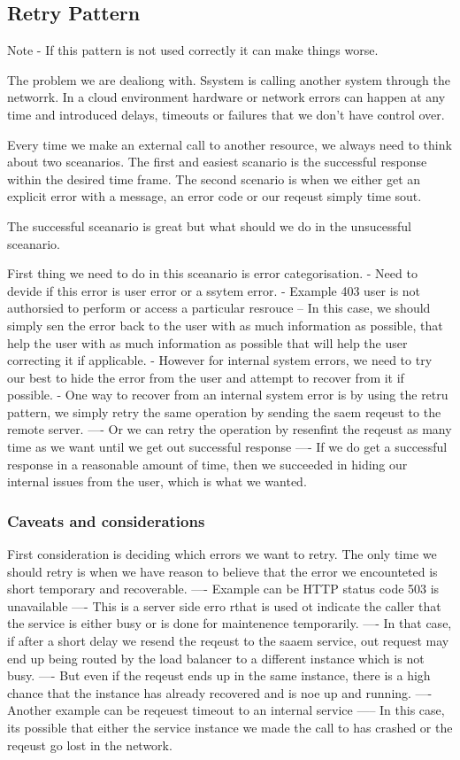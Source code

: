 \documentclass[a4paper, 11pt]{book}
\begin{document}
    \subsection{Retry Pattern}
    Note - If this pattern is not used correctly it can make things worse.

    The problem we are dealiong with.
    Ssystem is calling another system through the networrk.
    In a cloud environment hardware or network errors can happen at any time and introduced delays, timeouts or failures that we don't have control over.

    Every time we make an external call to another resource, we always need to think about two sceanarios.
    The first and easiest scanario is the successful response within the desired time frame.
    The second scenario is when we either get an explicit error with a message, an error code or our reqeust simply time sout.

    The successful sceanario is great but what should we do in the unsucessful sceanario.

    First thing we need to do in this sceanario is error categorisation.
    - Need to devide if this error is user error or a ssytem error.
    - Example 403 user is not authorsied to perform or access a particular resrouce
    -- In this case, we should simply sen the error back to the user with as much information as possible, that help the user with as much information as possible that will help the user correcting it if applicable.
    - However for internal system errors, we need to try our best to hide the error from the user and attempt to recover from it if possible.
    - One way to recover from an internal system error is by using the retru pattern, we simply retry the same operation by sending the saem reqeust to the remote server.
    ---- Or we can retry the operation by resenfint the reqeust as many time as we want until we get out successful response
    ---- If we do get a successful response in a reasonable amount of time, then we succeeded in hiding our internal issues from the user, which is what we wanted.

    \subsubsection{Caveats and considerations}
    First consideration is deciding which errors we want to retry.
    The only time we should retry is when we have reason to believe that the error we encounteted is short temporary and recoverable.
    ---- Example can be HTTP status code 503 is unavailable
    ---- This is a server side erro rthat is used ot indicate the caller that the service is either busy or is done for maintenence temporarily.
    ---- In that case, if after a short delay we resend the reqeust to the saaem service, out request may end up being routed by the load balancer to a different instance which is not busy.
    ---- But even if the reqeust ends up in the same instance, there is a high chance that the instance has already recovered and is noe up and running.
    ---- Another example can be reqeuest timeout to an internal service
    ----- In this case, its possible that either the service instance we made the call to has crashed or the reqeust go lost in the network.
\end{document}
